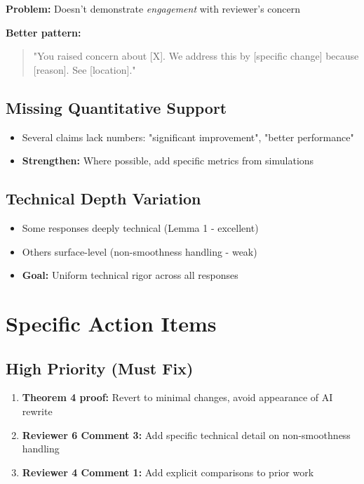 \documentclass[11pt]{article}
\begin{document}
\textbf{Problem:} Doesn't demonstrate \textit{engagement} with reviewer's concern

\textbf{Better pattern:}
\begin{quote}
"You raised concern about [X]. We address this by [specific change] because [reason]. See [location]."
\end{quote}

\subsection{Missing Quantitative Support}

\begin{itemize}
\item Several claims lack numbers: "significant improvement", "better performance"
\item \textbf{Strengthen:} Where possible, add specific metrics from simulations
\end{itemize}

\subsection{Technical Depth Variation}

\begin{itemize}
\item Some responses deeply technical (Lemma 1 - excellent)
\item Others surface-level (non-smoothness handling - weak)
\item \textbf{Goal:} Uniform technical rigor across all responses
\end{itemize}

\section{Specific Action Items}

\subsection{High Priority (Must Fix)}

\begin{enumerate}
\item \textcolor{critical}{\textbf{Theorem 4 proof:}} Revert to minimal changes, avoid appearance of AI rewrite
\item \textcolor{critical}{\textbf{Reviewer 6 Comment 3:}} Add specific technical detail on non-smoothness handling
\item \textcolor{warning}{\textbf{Reviewer 4 Comment 1:}} Add explicit comparisons to prior work
\end{enumerate}
\end{document}
